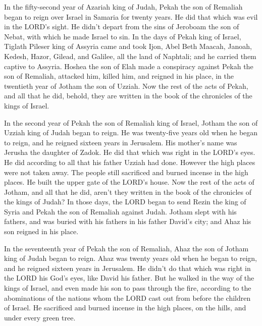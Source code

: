 \myverse{}In the fifty-second year of Azariah king of Judah, Pekah the
son of Remaliah began to reign over Israel in Samaria for twenty years.
\myverse{}He did that which was evil in the LORD’s sight. He didn’t depart from the
sins of Jeroboam the son of Nebat, with which he made Israel to sin.
\myverse{}In the days of Pekah king of Israel, Tiglath Pileser king of Assyria came
and took Ijon, Abel Beth Maacah, Janoah, Kedesh, Hazor, Gilead, and Galilee, all the land of Naphtali;
and he carried them captive to Assyria.
\myverse{}Hoshea the son of Elah made a conspiracy against Pekah the son of Remaliah,
attacked him, killed him, and reigned in his place, in the twentieth year of Jotham the son of Uzziah.
\myverse{}Now the rest of the acts of Pekah, and all that he did, behold, they are
written in the book of the chronicles of the kings of Israel.

\myverse{}In the second year of Pekah the son of Remaliah king of Israel,
Jotham the son of Uzziah king of Judah began to reign.
\myverse{}He was twenty-five years old when he began to reign, and he reigned sixteen
years in Jerusalem. His mother’s name was Jerusha the daughter of Zadok.
\myverse{}He did that which was right in the LORD’s eyes. He did according to all that
his father Uzziah had done.
\myverse{}However the high places were not taken away. The people still sacrificed
and burned incense in the high places. He built the upper gate of the LORD’s house.
\myverse{}Now the rest of the acts of Jotham, and all that he did, aren’t they written
in the book of the chronicles of the kings of Judah?
\myverse{}In those days, the LORD began to send Rezin the king of Syria and Pekah the
son of Remaliah against Judah.
\myverse{}Jotham slept with his fathers, and was buried with his fathers in his father
David’s city; and Ahaz his son reigned in his place.


\mychapter{} \myverse*{}In the seventeenth year of Pekah the son of Remaliah, Ahaz the
son of Jotham king of Judah began to reign.
\myverse{}Ahaz was twenty years old when he began to reign, and he reigned sixteen years
in Jerusalem. He didn’t do that which was right in the LORD his God’s eyes, like David his father.
\myverse{}But he walked in the way of the kings of Israel, and even made his son to pass
through the fire, according to the abominations of the nations whom the LORD cast out from before the
children of Israel.
\myverse{}He sacrificed and burned incense in the high places, on the hills, and under
every green tree.

